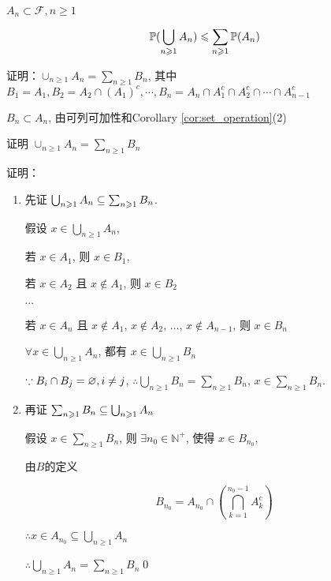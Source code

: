 \begin{property}[次可列可加性]
    $A_n\subset \mathcal{F}, n\geq 1$

    \[
    \mathbb{P}(\bigcup_{n\geqslant 1}A_n)\leqslant \sum_{n\geqslant 1}\mathbb{P}(A_n)
    \]
\end{property}

证明：$\cup_{n\geq 1}A_n=\sum_{n\geq 1}B_n$, 其中 $B_1=A_1, B_2=A_2\cap (A_1)^c,\cdots , B_n=A_n\cap A_1^c\cap A_2^c\cap \cdots \cap A_{n-1}^c$

$B_n\subset A_n$, 由可列可加性和Corollary \ref{cor:set_operation}(2)

\begin{problem}[作业1-2]\label{exer:disjoint_union}
证明 $\cup_{n\geq 1}A_n=\sum_{n\geq 1}B_n$
\end{problem}

证明：
\begin{enumerate}
    \item 先证 \(\bigcup_{n \geqslant 1} A_n \subseteq \sum_{n \geqslant 1} B_n\). 

    假设 \(x \in \bigcup_{n \geqslant 1} A_n\), 

    若 \(x \in A_1\), 则 \(x \in B_1\), 

    若 \(x \in A_2\) 且 \(x \notin A_1\), 则 \(x \in B_2\)

    $\cdots$

    若 \(x \in A_n\) 且 \(x \notin A_1\), \(x \notin A_2\), \(\ldots\), \(x \notin A_{n-1}\), 则 \(x \in B_n\)

    $\forall x\in \bigcup_{n\geq 1}A_n$, 都有 $x\in \bigcup_{n\geq 1}B_n$

    \(\because B_i \cap B_j = \varnothing,i\neq j\), \(\therefore \bigcup_{n \geqslant 1} B_n = \sum_{n \geqslant 1} B_n\), \(x \in \sum_{n \geqslant 1} B_n\). 

    \item 再证 \(\sum_{n \geqslant 1} B_n \subseteq \bigcup_{n \geqslant 1} A_n\)

    假设 \(x \in \sum_{n \geqslant 1} B_n\), 则 \(\exists n_0 \in \mathbb{N}^+\), 使得 \(x \in B_{n_0}\), 

    由$B$的定义

    \[
    B_{n_0} = A_{n_0} \cap \left( \bigcap_{k=1}^{n_0-1} A_k^c \right)
    \]

    \(\therefore x \in A_{n_0} \subseteq \bigcup_{n \geqslant 1} A_n\)

    \(\therefore \bigcup_{n \geqslant 1} A_n = \sum_{n \geqslant 1} B_n\)\qed
\end{enumerate}

